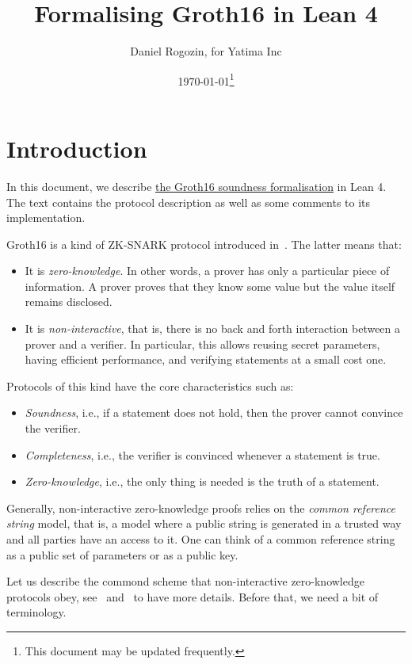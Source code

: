 \documentclass{article}
\title{Formalising Groth16 in Lean 4}
\author{Daniel Rogozin, for Yatima Inc}
\date{\today\footnote{This document may be updated frequently.}}
\theoremstyle{definition}
\theoremstyle{remark}
\begin{document}
\maketitle

\section{Introduction}

In this document, we describe \href{https://github.com/yatima-inc/ZKSnark.lean/blob/main/ZkSNARK/Groth16/KnowledgeSoundness.lean}{the Groth16 soundness formalisation} in Lean 4.
The text contains the protocol description as well as some comments to its implementation.

Groth16 is a kind of ZK-SNARK protocol introduced in~\cite{groth2016size}. The latter means that:

\begin{itemize}
\item It is \emph{zero-knowledge}.
  In other words, a prover has only a particular piece of information.
  A prover proves that they know some value but the value itself remains disclosed.
\item It is \emph{non-interactive}, that is, there is no back and forth interaction
between a prover and a verifier. In particular, this allows reusing secret parameters,
having efficient performance, and verifying statements at a small cost one.
\end{itemize}

Protocols of this kind have the core characteristics such as:
\begin{itemize}
\item \emph{Soundness}, i.e., if a statement does not hold, then the prover cannot convince the verifier.
\item \emph{Completeness}, i.e., the verifier is convinced whenever a statement is true.
\item \emph{Zero-knowledge}, i.e., the only thing is needed is the truth of a statement.
\end{itemize}

Generally, non-interactive zero-knowledge proofs relies on the \emph{common reference string} model,
that is, a model where a public string is generated in a trusted way and all parties have an access to it.
One can think of a common reference string as a public set of parameters or as a public key.

Let us describe the commond scheme that non-interactive zero-knowledge protocols obey, see~\cite{petkus2019and} and~\cite{bitansky2012extractable} to have more details. Before that, we need a bit of terminology.
\end{document}
